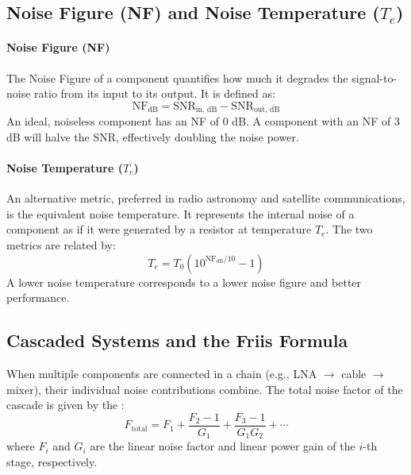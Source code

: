 \subsection{Noise Figure (NF) and Noise Temperature ($T_e$)}

\paragraph{Noise Figure (NF)}
The Noise Figure of a component quantifies how much it degrades the signal-to-noise ratio from its input to its output. It is defined as:
\begin{equation}
    \text{NF}_{\text{dB}} = \text{SNR}_{\text{in, dB}} - \text{SNR}_{\text{out, dB}}
\end{equation}
An ideal, noiseless component has an NF of 0 dB. A component with an NF of 3 dB will halve the SNR, effectively doubling the noise power.

\paragraph{Noise Temperature ($T_e$)}
An alternative metric, preferred in radio astronomy and satellite communications, is the equivalent noise temperature. It represents the internal noise of a component as if it were generated by a resistor at temperature $T_e$. The two metrics are related by:
\begin{equation}
    T_e = T_0 (10^{\text{NF}_{\text{dB}}/10} - 1)
\end{equation}
A lower noise temperature corresponds to a lower noise figure and better performance.


\subsection{Cascaded Systems and the Friis Formula}

When multiple components are connected in a chain (e.g., LNA $\rightarrow$ cable $\rightarrow$ mixer), their individual noise contributions combine. The total noise factor of the cascade is given by the :
\begin{equation}
    F_{\text{total}} = F_1 + \frac{F_2 - 1}{G_1} + \frac{F_3 - 1}{G_1 G_2} + \cdots
\end{equation}
where $F_i$ and $G_i$ are the linear noise factor and linear power gain of the $i$-th stage, respectively.

